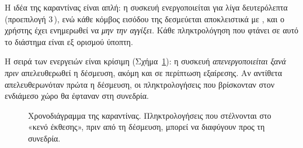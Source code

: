 Η ιδέα της καραντίνας είναι απλή: η συσκευή ενεργοποιείται για λίγα δευτερόλεπτα
(προεπιλογή 3\,), ενώ κάθε κόμβος εισόδου της δεσμεύεται αποκλειστικά με
, και ο χρήστης έχει ενημερωθεί να \emph{μην την αγγίξει}. Κάθε
πληκτρολόγηση που φτάνει σε αυτό το διάστημα είναι εξ ορισμού ύποπτη.

Η σειρά των ενεργειών είναι κρίσιμη (Σχήμα~\ref{fig:quarantine}): η συσκευή
\emph{απενεργοποιείται ξανά πριν} απελευθερωθεί η δέσμευση, ακόμη και σε
περίπτωση εξαίρεσης. Αν αντίθετα απελευθερωνόταν πρώτα η δέσμευση, οι
πληκτρολογήσεις που βρίσκονταν στον ενδιάμεσο χώρο θα έφταναν στη συνεδρία.

\begin{figure}[htbp]
\centering
{}
\caption{Χρονοδιάγραμμα της καραντίνας. Πληκτρολογήσεις που στέλνονται στο
«κενό έκθεσης», πριν από τη δέσμευση, μπορεί να διαφύγουν προς τη συνεδρία.}
\label{fig:quarantine}
\end{figure}

